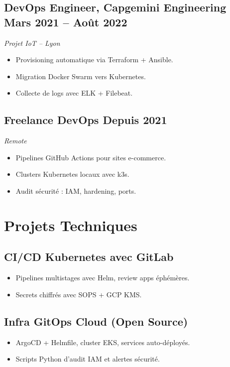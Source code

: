 \documentclass[a4paper,10pt]{article}
\begin{document}
\subsection{DevOps Engineer, Capgemini Engineering \hfill Mars 2021 -- Août 2022}
\textit{Projet IoT – Lyon}
\begin{itemize}[leftmargin=*]
    \item Provisioning automatique via Terraform + Ansible.
    \item Migration Docker Swarm vers Kubernetes.
    \item Collecte de logs avec ELK + Filebeat.
\end{itemize}

\subsection{Freelance DevOps \hfill Depuis 2021}
\textit{Remote}
\begin{itemize}[leftmargin=*]
    \item Pipelines GitHub Actions pour sites e-commerce.
    \item Clusters Kubernetes locaux avec k3s.
    \item Audit sécurité : IAM, hardening, ports.
\end{itemize}

\section*{Projets Techniques}
\subsection{CI/CD Kubernetes avec GitLab}
\begin{itemize}[leftmargin=*]
    \item Pipelines multistages avec Helm, review apps éphémères.
    \item Secrets chiffrés avec SOPS + GCP KMS.
\end{itemize}

\subsection{Infra GitOps Cloud (Open Source)}
\begin{itemize}[leftmargin=*]
    \item ArgoCD + Helmfile, cluster EKS, services auto-déployés.
    \item Scripts Python d'audit IAM et alertes sécurité.
\end{itemize}
\end{document}

